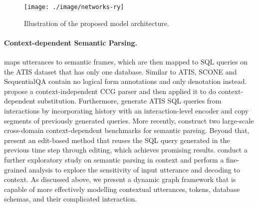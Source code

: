 \documentclass[letterpaper]{article} \usepackage{aaai21}  \usepackage{times}  \usepackage{helvet} \usepackage{courier}  \usepackage[hyphens]{url}  \usepackage{graphicx} \urlstyle{rm} \def\UrlFont{\rm}  \usepackage{natbib}  \usepackage{caption} \frenchspacing  \setlength{\pdfpagewidth}{8.5in}  \setlength{\pdfpageheight}{11in}
\begin{document}
\begin{figure*}
	\centering
	\texttt{[image: ./image/networks-ry]}
	\caption{Illustration of the proposed model architecture.}
	\label{arch}
\end{figure*}

\paragraph{Context-dependent Semantic Parsing.}
\citet{DBLP:conf/acl/MillerSBS96} maps utterances to semantic frames, which are then mapped to SQL
queries on the ATIS dataset \cite{DBLP:conf/naacl/HemphillGD90} that has only one database.
Similar to ATIS, SCONE \cite{DBLP:conf/acl/LongPL16,DBLP:conf/acl/GuuPLL17,DBLP:conf/naacl/FriedAK18,DBLP:conf/acl/ArtziS18,DBLP:conf/iclr/HuangCY19} and SequentialQA \cite{DBLP:conf/acl/IyyerYC17} contain no logical form annotations and only denotation \cite{Berant2014SemanticPV} instead.
\citet{DBLP:conf/acl/ZettlemoyerC09} propose a context-independent CCG parser and then applied
it to do context-dependent substitution.
Furthermore, \citet{DBLP:conf/naacl/SuhrIA18} generate ATIS SQL queries from interactions by incorporating history with an interaction-level encoder and copy segments of previously generated queries.
More recently, \citet{DBLP:conf/emnlp/YuZELXPLTSLJYSC19,DBLP:conf/acl/YuZYTLLELPCJDPS19} construct two large-scale cross-domain context-dependent benchmarks for semantic parsing.
Beyond that, \citet{DBLP:conf/emnlp/ZhangYESXLSXSR19} present
an edit-based method that reuses the SQL query generated in the previous time step through editing, which achieves promising results.
\citet{DBLP:conf/ijcai/LiuCGLZZ20} conduct a further exploratory study on semantic parsing in context and perform a fine-grained analysis to explore the sensitivity of input utterance and decoding to context.
As discussed above, we present a dynamic graph framework that is capable of more effectively modelling contextual utterances, tokens, database schemas, and their complicated interaction.
\end{document}
